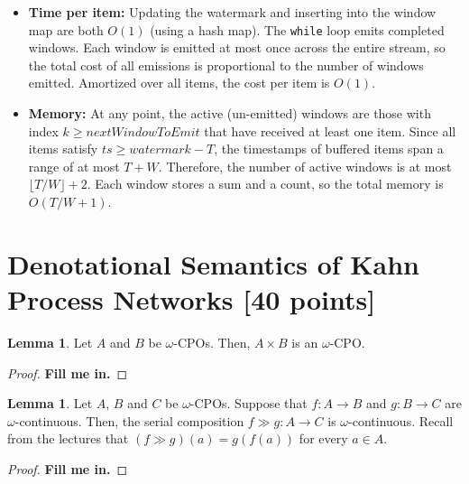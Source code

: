 \documentclass[11pt]{article}
\newcommand{\mnt}[1]{{\small\texttt{#1}}}
\theoremstyle{definition}
\newtheorem{myLemma}[thm]{Lemma}{\bfseries}{}
\newcommand{\red}[1]{\textbf{\color{red} #1}}
\newcommand{\serial}{\gg}
\newcommand{\ts}{\mathit{ts}}
\begin{document}
\begin{itemize}
	\item \textbf{Time per item:} Updating the watermark and inserting into the window map are both $O(1)$ (using a hash map). The \mnt{while} loop emits completed windows. Each window is emitted at most once across the entire stream, so the total cost of all emissions is proportional to the number of windows emitted. Amortized over all items, the cost per item is $O(1)$.

	\item \textbf{Memory:} At any point, the active (un-emitted) windows are those with index $k \geq \mathit{nextWindowToEmit}$ that have received at least one item. Since all items satisfy $\ts \geq \mathit{watermark} - T$, the timestamps of buffered items span a range of at most $T + W$. Therefore, the number of active windows is at most $\lfloor T/W \rfloor + 2$. Each window stores a sum and a count, so the total memory is $O(T/W + 1)$.
\end{itemize}

\clearpage %
\section{Denotational Semantics of Kahn Process Networks [40 points]}

\begin{myLemma}
	Let $A$ and $B$ be $\omega$-CPOs. Then, $A \times B$ is an $\omega$-CPO.
\end{myLemma}
\begin{proof}
	\red{Fill me in.}
\end{proof}

\begin{myLemma}
	Let $A$, $B$ and $C$ be $\omega$-CPOs. Suppose that $f: A \to B$ and $g: B \to C$ are $\omega$-continuous. Then, the serial composition $f \serial g: A \to C$ is $\omega$-continuous. Recall from the lectures that $(f \serial g)(a) = g(f(a))$ for every $a \in A$.
\end{myLemma}
\begin{proof}
	\red{Fill me in.}
\end{proof}
\end{document}
